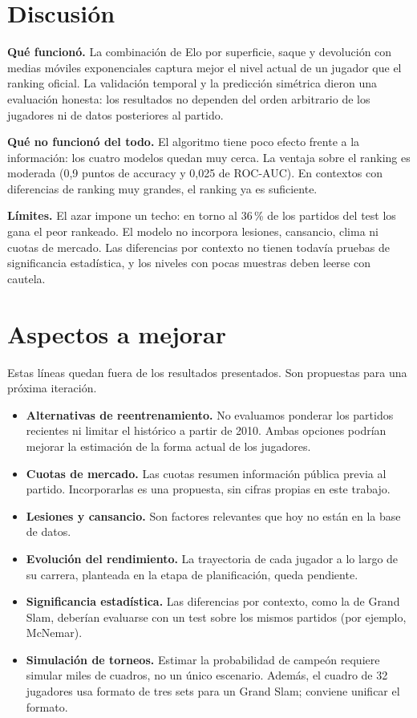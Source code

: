 \documentclass[11pt,a4paper]{article}
\begin{document}
\section{Discusión}

\textbf{Qué funcionó.} La combinación de Elo por superficie, saque y devolución con medias móviles exponenciales captura mejor el nivel actual de un jugador que el ranking oficial. La validación temporal y la predicción simétrica dieron una evaluación honesta: los resultados no dependen del orden arbitrario de los jugadores ni de datos posteriores al partido.

\textbf{Qué no funcionó del todo.} El algoritmo tiene poco efecto frente a la información: los cuatro modelos quedan muy cerca. La ventaja sobre el ranking es moderada (0,9 puntos de accuracy y 0,025 de ROC-AUC). En contextos con diferencias de ranking muy grandes, el ranking ya es suficiente.

\textbf{Límites.} El azar impone un techo: en torno al 36\,\% de los partidos del test los gana el peor rankeado. El modelo no incorpora lesiones, cansancio, clima ni cuotas de mercado. Las diferencias por contexto no tienen todavía pruebas de significancia estadística, y los niveles con pocas muestras deben leerse con cautela.

\section{Aspectos a mejorar}

Estas líneas quedan fuera de los resultados presentados. Son propuestas para una próxima iteración.

\begin{itemize}
  \item \textbf{Alternativas de reentrenamiento.} No evaluamos ponderar los partidos recientes ni limitar el histórico a partir de 2010. Ambas opciones podrían mejorar la estimación de la forma actual de los jugadores.
  \item \textbf{Cuotas de mercado.} Las cuotas resumen información pública previa al partido. Incorporarlas es una propuesta, sin cifras propias en este trabajo.
  \item \textbf{Lesiones y cansancio.} Son factores relevantes que hoy no están en la base de datos.
  \item \textbf{Evolución del rendimiento.} La trayectoria de cada jugador a lo largo de su carrera, planteada en la etapa de planificación, queda pendiente.
  \item \textbf{Significancia estadística.} Las diferencias por contexto, como la de Grand Slam, deberían evaluarse con un test sobre los mismos partidos (por ejemplo, McNemar).
  \item \textbf{Simulación de torneos.} Estimar la probabilidad de campeón requiere simular miles de cuadros, no un único escenario. Además, el cuadro de 32 jugadores usa formato de tres sets para un Grand Slam; conviene unificar el formato.
\end{itemize}
\end{document}
